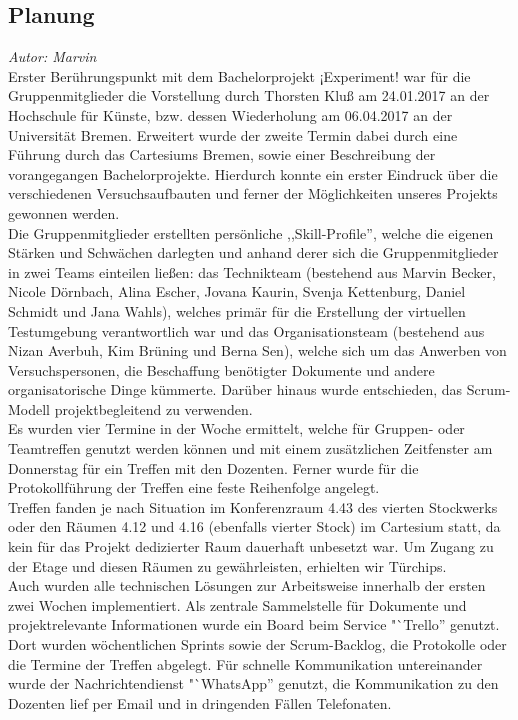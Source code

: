 \documentclass{Bericht}
\begin{document}
\subsection{Planung} %
\textit{Autor: Marvin}\\
		Erster Berührungspunkt mit dem Bachelorprojekt ¡Experiment! war für die Gruppenmitglieder die Vorstellung durch Thorsten Kluß am 24.01.2017 an der Hochschule für Künste, bzw. dessen Wiederholung am 06.04.2017 an der Universität Bremen. Erweitert wurde der zweite Termin dabei durch eine Führung durch das Cartesiums Bremen, sowie einer Beschreibung der vorangegangen Bachelorprojekte. Hierdurch konnte ein erster Eindruck über die verschiedenen Versuchsaufbauten und ferner der Möglichkeiten unseres Projekts gewonnen werden.\\
Die Gruppenmitglieder erstellten persönliche ,,Skill-Profile'', welche die eigenen Stärken und Schwächen darlegten und anhand derer sich die Gruppenmitglieder in zwei Teams einteilen ließen: das Technikteam (bestehend aus Marvin Becker, Nicole Dörnbach, Alina Escher, Jovana Kaurin, Svenja Kettenburg, Daniel Schmidt und Jana Wahls), welches primär für die Erstellung der virtuellen Testumgebung verantwortlich war und das Organisationsteam (bestehend aus Nizan Averbuh, Kim Brüning und Berna Sen), welche sich um das Anwerben von Versuchspersonen, die Beschaffung benötigter Dokumente und andere organisatorische Dinge kümmerte.
Darüber hinaus wurde entschieden, das Scrum-Modell projektbegleitend zu verwenden.\\
Es wurden vier Termine in der Woche ermittelt, welche für Gruppen- oder Teamtreffen genutzt werden können und mit einem zusätzlichen Zeitfenster am Donnerstag für ein Treffen mit den Dozenten. Ferner wurde für die Protokollführung der Treffen eine feste Reihenfolge angelegt.\\
Treffen fanden je nach Situation im Konferenzraum 4.43 des vierten Stockwerks oder den Räumen 4.12 und 4.16 (ebenfalls vierter Stock) im Cartesium statt, da kein für das Projekt dedizierter Raum dauerhaft unbesetzt war. Um Zugang zu der Etage und diesen Räumen zu gewährleisten, erhielten wir Türchips.\\
Auch wurden alle technischen Lösungen zur Arbeitsweise innerhalb der ersten zwei Wochen implementiert. Als zentrale Sammelstelle für Dokumente und projektrelevante Informationen wurde ein Board beim Service "`Trello'' genutzt. Dort wurden wöchentlichen Sprints sowie der Scrum-Backlog, die Protokolle oder die Termine der Treffen abgelegt. Für schnelle Kommunikation untereinander wurde der Nachrichtendienst "`WhatsApp'' genutzt, die Kommunikation zu den Dozenten lief per Email und in dringenden Fällen Telefonaten.\\
\end{document}
